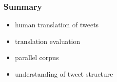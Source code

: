 \documentclass[12pt]{beamer}
\begin{document}
\begin{frame}
	\frametitle{Summary}
	\begin{itemize}
		\item \textcolor{TCTwhite}{\Large human translation of tweets}
		\item \textcolor{TCTwhite}{\Large translation evaluation}
		\item \textcolor{TCTwhite}{\Large parallel corpus}
		\item \textcolor{TCTwhite}{\Large understanding of tweet structure}
	\end{itemize}
\end{frame}
\end{document}

